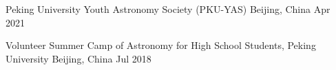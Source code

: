 


\begin{cventries}

{Peking University Youth Astronomy Society (PKU-YAS)}
{Beijing, China}
{Apr 2021}
{}


\cventry
{Volunteer} %
{Summer Camp of Astronomy for High School Students, Peking University} %
{Beijing, China} %
{Jul 2018} %
{ %
}




{ %
}

\end{cventries}